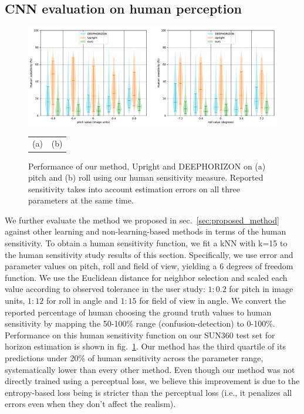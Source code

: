 \subsection{CNN evaluation on human perception}
\label{sec:cnn-evaluation-perception}

\begin{figure}
\centering
\includegraphics[width=\linewidth]{figures/method/human_sensitivity_performance_SUN360.pdf}
\begin{tabular}{p{0.5\linewidth}p{0.5\linewidth}}
\hspace{1.5cm}(a) & \hspace{1.3cm}(b)
\end{tabular}
\caption{Performance of our method, Upright and DEEPHORIZON on (a) pitch and (b) roll using our human sensitivity measure. Reported sensitivity takes into account estimation errors on all three parameters at the same time.}
\label{fig:method_human_performance}
\end{figure}


We further evaluate the method we proposed in sec.~\ref{sec:proposed_method} against other learning and non-learning-based methods in terms of the human sensitivity. To obtain a human sensitivity function, we fit a kNN with k=15 to the human sensitivity study results of this section. Specifically, we use error and parameter values on pitch, roll and field of view, yielding a 6 degrees of freedom function. We use the Euclidean distance for neighbor selection and scaled each value according to observed tolerance in the user study: $1{:}0.2$ for pitch in image units, $1{:}12$ for roll in angle and $1{:}15$ for field of view in angle. We convert the reported percentage of human choosing the ground truth values to human sensitivity by mapping the 50-100\% range (confusion-detection) to 0-100\%. Performance on this human sensitivity function on our SUN360 test set for horizon estimation is shown in fig.~\ref{fig:method_human_performance}. Our method has the third quartile of its predictions under 20\% of human sensitivity across the parameter range, systematically lower than every other method. Even though our method was not directly trained using a perceptual loss, we believe this improvement is due to the entropy-based loss being is stricter than the perceptual loss (i.e., it penalizes all errors even when they don't affect the realism).

